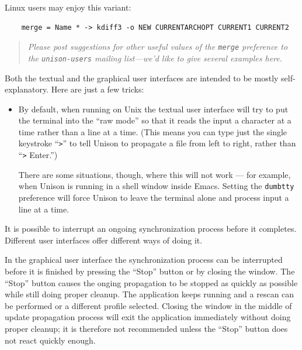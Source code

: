 \documentclass{article}
\begin{document}
Linux users may enjoy this variant:
\begin{verbatim}
    merge = Name * -> kdiff3 -o NEW CURRENTARCHOPT CURRENT1 CURRENT2
\end{verbatim}

\begin{quote}
\it
Please post suggestions for other useful values of the
\verb|merge| preference to the {\tt unison-users} mailing list---we'd like
to give several examples here.
\end{quote}



Both the textual and the graphical user interfaces are intended to be
mostly self-explanatory.  Here are just a few tricks:
\begin{itemize}
\item By default, when running on Unix the textual user interface will
try to put the terminal into the ``raw mode'' so that it reads the input a
character at a time rather than a line at a time.  (This means you can
type just the single keystroke ``\verb|>|'' to tell Unison to
propagate a file from left to right, rather than ``\verb|>| Enter.'')

There are some situations, though, where this will not work --- for
example, when Unison is running in a shell window inside Emacs.
Setting the \verb|dumbtty| preference will force Unison to leave the
terminal alone and process input a line at a time.
\end{itemize}


It is possible to interrupt an ongoing synchronization process before it
completes. Different user interfaces offer different ways of doing it.

\begin{tkui}
In the graphical user interface the synchronization process can be interrupted
before it is finished by pressing the ``Stop'' button or by closing the window.
The ``Stop'' button causes the onging propagation to be stopped as quickly as
possible while still doing proper cleanup. The application keeps running and a
rescan can be performed or a different profile selected. Closing the window in
the middle of update propagation process will exit the application immediately
without doing proper cleanup; it is therefore not recommended unless the
``Stop'' button does not react quickly enough.
\end{tkui}
\end{document}
